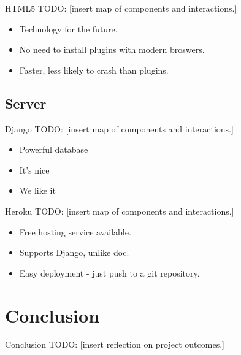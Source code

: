 \documentclass{beamer}
\begin{document}
\begin{frame}{HTML5}
  TODO:
  [insert map of components and interactions.]
  \begin{itemize}
    \item Technology for the future.
    \item No need to install plugins with modern broswers.
    \item Faster, less likely to crash than plugins.
  \end{itemize}
\end{frame}

\subsection{Server}

\begin{frame}{Django}
  TODO:
  [insert map of components and interactions.]
  \begin{itemize}
    \item Powerful database
    \item It's nice
    \item We like it
  \end{itemize}
\end{frame}

\begin{frame}{Heroku}
  TODO:
  [insert map of components and interactions.]
  \begin{itemize}
    \item Free hosting service available.
    \item Supports Django, unlike doc.
    \item Easy deployment - just push to a git repository.
  \end{itemize}
\end{frame}


\section{Conclusion}

\begin{frame}{Conclusion}
  TODO:
  [insert reflection on project outcomes.]
\end{frame}
\end{document}
